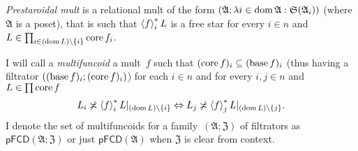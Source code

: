 \begin{defn}
\emph{Prestaroidal mult} is a relational mult of the form $(\mathfrak{A};\lambda i\in\operatorname{dom}\mathfrak{A}:\mathfrak{S}(\mathfrak{A}_{i}))$
(where $\mathfrak{A}$ is a poset), that is such that $\left\langle f\right\rangle ^{\ast}_{i}L$
is a free star for every $i\in n$ and $L\in\prod_{i\in(\operatorname{dom} L)\setminus\{i\}}\operatorname{core} f_i$.
\end{defn}

\begin{defn}
I will call a \emph{multifuncoid} a mult~$f$ such
that $(\operatorname{core} f)_{i}\subseteq(\operatorname{base} f)_{i}$ (thus having a filtrator
$((\operatorname{base} f)_{i};(\operatorname{core} f)_{i})$) for each $i\in n$ and for every
$i,j\in n$ and $L\in\prod\operatorname{core} f$ 
\begin{equation}
L_{i}\not\asymp\left\langle f\right\rangle ^{\ast}_{i}L|_{(\operatorname{dom} L)\setminus\{i\}}\Leftrightarrow L_{j}\not\asymp\left\langle f\right\rangle ^{\ast}_{j}L|_{(\operatorname{dom} L)\setminus\{j\}}.\label{alpha-cond}
\end{equation}
I denote the set of multifuncoids for a family~$(\mathfrak{A};\mathfrak{Z})$ of filtrators as
$\mathsf{pFCD}(\mathfrak{A};\mathfrak{Z})$ or just $\mathsf{pFCD}(\mathfrak{A})$ when $\mathfrak{Z}$ is clear from context.
\end{defn}

